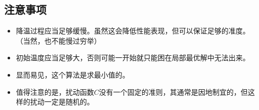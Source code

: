 \documentclass{ctexart}
\begin{document}
\subsection{注意事项}

\begin{itemize}
    \item 降温过程应当足够缓慢。虽然这会降低性能表现，但可以保证足够的准度。（当然，也不能慢过穷举）
    \item 初始温度应当足够大，否则可能一开始就只能困在局部最优解中无法出来。
    \item 显而易见，这个算法是求最小值的。
    \item 值得注意的是，扰动函数$C$没有一个固定的准则，其通常是因地制宜的，但这样的扰动一定是随机的。
\end{itemize}
\end{document}
